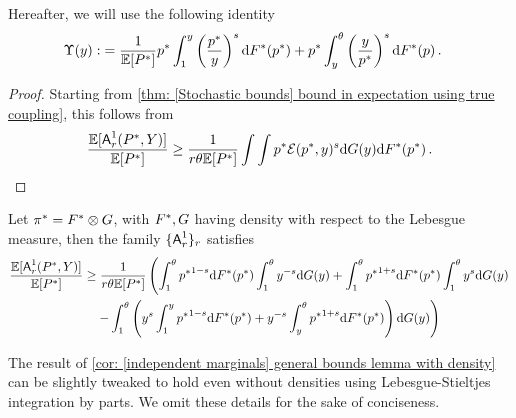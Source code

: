 

Hereafter, we will use the following identity
\begin{align*}
        \Upsilon(y):&= \frac{1}{\mathbb{E}[P^*]}p^* \int_1^y   \left(\frac{p^*}{y}\right)^s\mathrm{d} F^*(p^*) + p^* \int_y^\theta  \left(\frac{y}{p^*}\right)^s\mathrm{d} F^*(p)\,.\notag
\end{align*}


\IndependentMarginalsGeneralBounds*
\begin{proof}
    Starting from \cref{thm: [Stochastic bounds] bound in expectation using true coupling}, this follows from
    \[
        \frac{\mathbb{E}[\mbox{\textup{\textsf{A}}}^1_r(P^*,Y)]}{\mathbb{E}[P^*]}\ge\frac{1}{r\theta\mathbb{E}[P^*]}\int\int p^*\mathcal{E}(p^*,y)^{s}\mathrm{d} G(y)\mathrm{d}F^*(p^*)\,.
    \]
\end{proof}
\begin{corollary}\label{cor:  [independent marginals] general bounds lemma with density}
    Let $\pi^*=F^*\otimes G$, with $F^*,G$ having density with respect to the Lebesgue measure, then the family $\{\mbox{\textup{\textsf{A}}}^1_r\}_{r}$ satisfies 
    \begin{align}
    \frac{\mathbb{E}[\mbox{\textup{\textsf{A}}}^1_r(P^*,Y)]}{\mathbb{E}[P^*]}&\ge \frac{1}{r\theta\mathbb{E}[P^*]}\left( \int_1^\theta {p^*}^{1-s}\mathrm{d} F^*(p^*)\int_1^\theta y^{-s}\mathrm{d}G(y) + \int_1^\theta {p^*}^{1+s}\mathrm{d} F^*(p^*)\int_1^\theta y^{s}\mathrm{d}G(y)\right.\notag\\
    &\quad \left.-\int_1^\theta \left(y^{s}\int_1^y {p^*}^{1-s}\mathrm{d} F^*(p^*) + y^{-s}\int_y^\theta{p^*}^{1+s}\mathrm{d}F^*(p^*)\right)\mathrm{d}G(y)\right)\label{eq: [independent marginals] general bounds lemma with density}
    \end{align}
\end{corollary}

\begin{remark}
    The result of \cref{cor:  [independent marginals] general bounds lemma with density} can be slightly tweaked to hold even without densities using Lebesgue-Stieltjes integration by parts. We omit these details for the sake of conciseness.
\end{remark}

